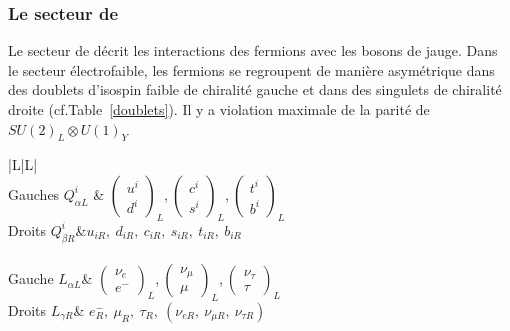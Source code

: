 \subsubsection{Le secteur de }
Le secteur de  décrit les interactions des fermions avec les bosons de jauge. Dans le secteur électrofaible, les fermions se regroupent de manière asymétrique dans des doublets d'isospin faible de chiralité gauche et dans des singulets de chiralité droite (cf.Table~\ref{doublets}). Il y a violation maximale de la parité de $SU(2)_{L}\otimes U(1)_{Y}$

\begin{table}[H]
	\centering
	\begin{tabular}{|L|L|} 
	\hline
	 \\
	\hline
	Gauches $Q_{\alpha L}^{i}$ & $
	\left(\begin{matrix} 
	 u^{i}\\
	 d^{i} 
	\end{matrix}\right)_{L}$,$\ 
	\left(\begin{matrix} 
	 c^{i}\\
	 s^{i}
	\end{matrix}\right)_{L}$,$\ 
	\left(\begin{matrix} 
	 t^{i}\\
	 b^{i}
	\end{matrix}\right)_{L}$ \\
	\hline
	Droits $Q_{\beta R}^{i}$&$ u_{iR},\ d_{iR},\ c_{iR},\ s_{iR},\ t_{iR},\ b_{iR}$\\
	\hline
	\rowcolor{Green2}\multicolumn{2}{|Cc|}{Leptons} \\
	\hline
	Gauche $L_{\alpha L}$& $
	\left(\begin{matrix} 
	\nu_{e}\\
	 e^{-}
	\end{matrix}\right)_{L}$,$\ 
	\left(\begin{matrix} 
	\nu_{\mu}\\
	\mu
	\end{matrix}\right)_{L}$,$\ 
	\left(\begin{matrix} 
	\nu_{\tau}\\
	\tau
	\end{matrix}\right)_{L} $\\
	\hline
	Droits $L_{\gamma R}$& $e^{-}_{R},\ \mu_{R},\ \tau_{R},\ \left(\nu_{e R},\ \nu_{\mu R},\ \nu_{\tau R}\right)$ \\
	\hline
\end{tabular}
\label{doublets}
\end{table}	

